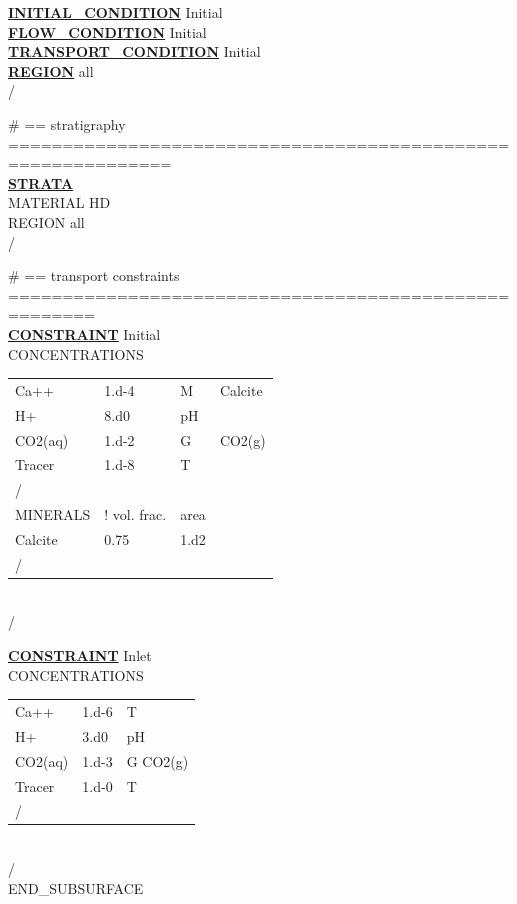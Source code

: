 \noindent
\hyperlink{target_init}{\bf INITIAL\_CONDITION} Initial\\
\hyperlink{target_flow_cond}{\bf FLOW\_CONDITION} Initial\\
\hyperlink{target_trans_cond}{\bf TRANSPORT\_CONDITION} Initial\\
\hyperlink{target_region}{\bf REGION} all\\
/

\noindent
\# == stratigraphy =============================================================\\
\hyperlink{target_strata}{\bf STRATA}\\
MATERIAL HD\\
REGION all\\
/

\noindent
\# == transport constraints ======================================================\\
\hyperlink{target_constraint}{\bf CONSTRAINT} Initial\\
CONCENTRATIONS\\
\begin{tabular}{llll}
Ca++    &1.d-4   &M  &Calcite\\[-4pt]
H+      &8.d0   &pH\\[-4pt]
CO2(aq) &1.d-2   &G  &CO2(g)\\[-4pt]
Tracer  &1.d-8   &T\\[-4pt]
/\\[-4pt]
MINERALS &! vol. frac.  &area\\[-4pt]
Calcite      &0.75      &1.d2\\[-4pt]
/\\[-4pt]
\end{tabular}\\
/

\noindent
\hyperlink{target_constraint}{\bf CONSTRAINT} Inlet\\
CONCENTRATIONS\\
\begin{tabular}{lll}
Ca++    &1.d-6   &T\\[-4pt]
H+      &3.d0   &pH\\[-4pt]
CO2(aq) &1.d-3   &G  CO2(g)\\[-4pt]
Tracer  &1.d-0   &T\\[-4pt]
/\\[-4pt]
\end{tabular}\\
/\\[-4pt]
END\_SUBSURFACE

\normalsize


